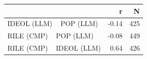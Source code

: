\begin{tabular}{lrr}
\toprule
 & r & N \\
\midrule
IDEOL (LLM) ~ POP (LLM) & -0.14 & 425 \\
RILE (CMP) ~ POP (LLM) & -0.08 & 449 \\
RILE (CMP) ~ IDEOL (LLM) & 0.64 & 426 \\
\bottomrule
\end{tabular}
